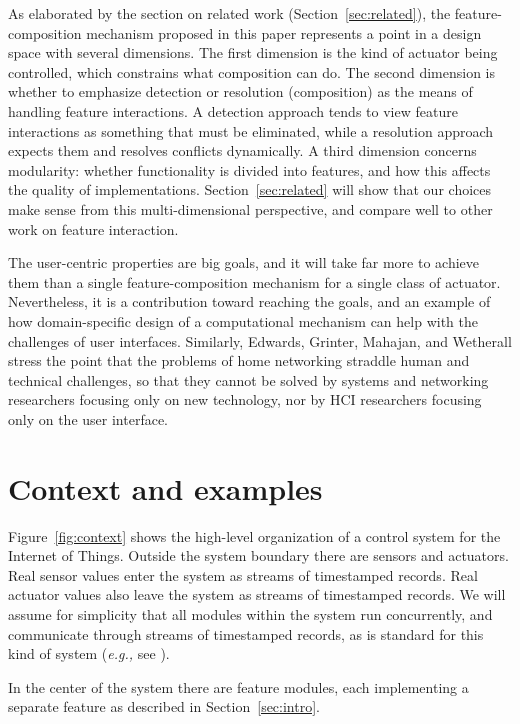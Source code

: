 \documentclass[conference]{IEEEtran}
\begin{document}
As elaborated by the section on related work (Section~\ref{sec:related}),
the feature-composition
mechanism proposed in this paper represents a point in a design
space with several dimensions.
The first dimension is the kind of actuator being controlled, which
constrains what composition can do.
The second dimension is whether to emphasize 
detection or resolution (composition)
as the means of handling feature interactions.
A detection approach tends to view feature interactions as something
that must be eliminated, while a resolution approach expects them and
resolves conflicts dynamically.
A third dimension concerns modularity: whether functionality is
divided into features, and how this
affects the quality of implementations.
Section~\ref{sec:related} will show that our choices make sense from
this multi-dimensional perspective, and compare well to other work on
feature interaction.

The user-centric properties are big goals, and it will take far more
to achieve them than a single feature-composition mechanism for a
single class of actuator.
Nevertheless, it is a contribution toward reaching the goals, and
an example of how domain-specific design of a computational mechanism
can help with the challenges of user interfaces. 
Similarly, Edwards, Grinter, Mahajan, and Wetherall \cite{homenet}
stress the point that
the problems of home networking straddle human and technical
challenges, so that they cannot be solved by systems and networking
researchers focusing only on new technology, nor by HCI researchers
focusing only on the user interface.

\section{Context and examples}
\label{sec:context}

Figure~\ref{fig:context} shows the high-level organization of a
control system for the Internet of Things.
Outside the system boundary there are sensors and actuators.
Real sensor values enter the system as streams of timestamped records.
Real actuator values also leave the system as streams of timestamped
records.
We will assume for simplicity that all modules within the system
run concurrently, and communicate through streams of timestamped records,
as is standard for this kind of system
({\it e.g.,} see \cite{CQL,spitfire,perla}).

In the center of the system there are feature modules, each
implementing a separate feature as described in Section~\ref{sec:intro}.
\end{document}
